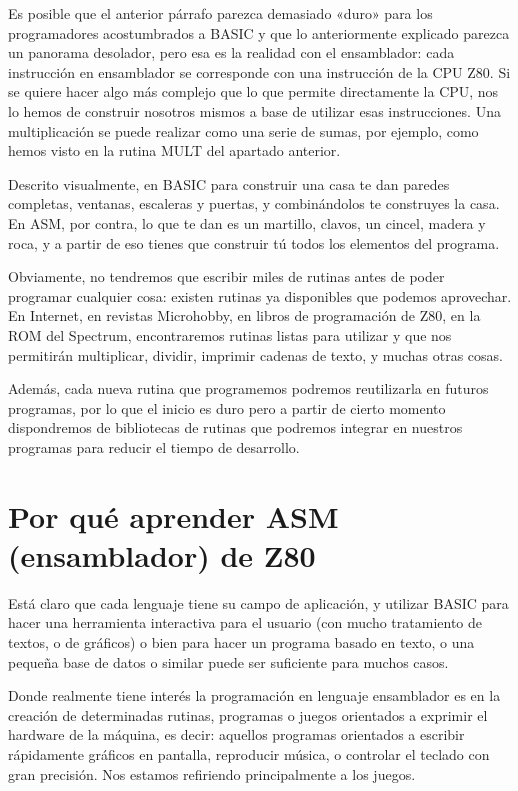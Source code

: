 \documentclass[letterpaper,10pt,spanish]{sphinxmanual}
\begin{document}
Es posible que el anterior párrafo parezca demasiado «duro» para los programadores acostumbrados a BASIC y que lo anteriormente explicado parezca un panorama desolador, pero esa es la realidad con el ensamblador: cada instrucción en ensamblador se corresponde con una instrucción de la CPU Z80. Si se quiere hacer algo más complejo que lo que permite directamente la CPU, nos lo hemos de construir nosotros mismos a base de utilizar esas instrucciones. Una multiplicación se puede realizar como una serie de sumas, por ejemplo, como hemos visto en la rutina MULT del apartado anterior.

Descrito visualmente, en BASIC para construir una casa te dan paredes completas, ventanas, escaleras y puertas, y combinándolos te construyes la casa. En ASM, por contra, lo que te dan es un martillo, clavos, un cincel, madera y roca, y a partir de eso tienes que construir tú todos los elementos del programa.

Obviamente, no tendremos que escribir miles de rutinas antes de poder programar cualquier cosa: existen rutinas ya disponibles que podemos aprovechar. En Internet, en revistas Microhobby, en libros de programación de Z80, en la ROM del Spectrum, encontraremos rutinas listas para utilizar y que nos permitirán multiplicar, dividir, imprimir cadenas de texto, y muchas otras cosas.

Además, cada nueva rutina que programemos podremos reutilizarla en futuros programas, por lo que el inicio es duro pero a partir de cierto momento dispondremos de bibliotecas de rutinas que podremos integrar en nuestros programas para reducir el tiempo de desarrollo.


\section{Por qué aprender ASM (ensamblador) de Z80}
\label{\detokenize{02_introduccion/introduccion:por-que-aprender-asm-ensamblador-de-z80}}
Está claro que cada lenguaje tiene su campo de aplicación, y utilizar BASIC para hacer una herramienta interactiva para el usuario (con mucho tratamiento de textos, o de gráficos) o bien para hacer un programa basado en texto, o una pequeña base de datos o similar puede ser suficiente para muchos casos.

Donde realmente tiene interés la programación en lenguaje ensamblador es en la creación de determinadas rutinas, programas o juegos orientados a exprimir el hardware de la máquina, es decir: aquellos programas orientados a escribir rápidamente gráficos en pantalla, reproducir música, o controlar el teclado con gran precisión. Nos estamos refiriendo principalmente a los juegos.
\end{document}
